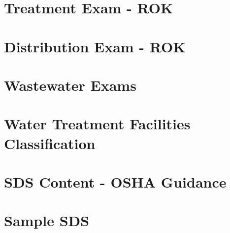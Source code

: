 \documentclass[11pt,fleqn]{book} %
\begin{document}
\appendix

\renewcommand{\chaptername}{Appendix A: } %

\vfill

\appendix
{} %


\chapter{Treatment Exam - ROK}\label{appendix:Treatment Exam - ROK}


\chapter{Distribution Exam - ROK}\label{appendix:Distribution Exam - ROK}


\chapter{Wastewater Exams}\label{appendix:Wastewater Exams}


\chapter{Water Treatment Facilities Classification}\label{appendix:Water Treatment Facilities Classification}


\chapter{SDS Content - OSHA Guidance}\label{appendix:SDS Content - OSHA Guidance}


\chapter{Sample SDS}\label{appendix:Sample SDS}

\end{document}
